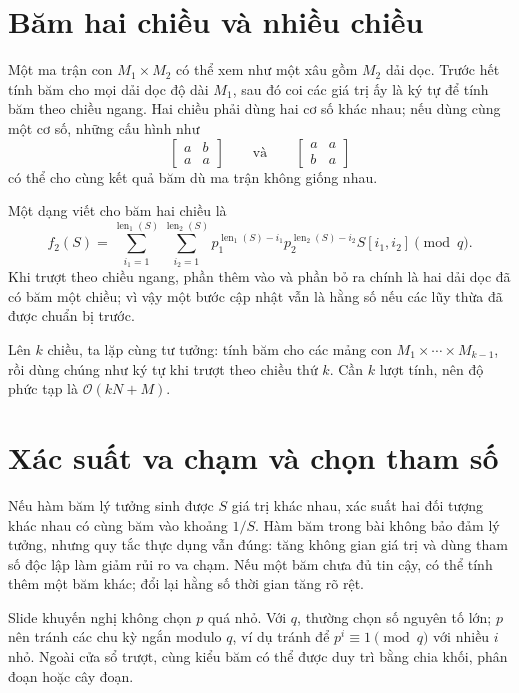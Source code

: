 \documentclass[11pt]{article}
\newcommand{\Oh}{\mathcal{O}}
\begin{document}
\section{Băm hai chiều và nhiều chiều}

Một ma trận con \(M_1\times M_2\) có thể xem như một xâu gồm \(M_2\) dải dọc.
Trước hết tính băm cho mọi dải dọc độ dài \(M_1\), sau đó coi các giá trị ấy
là ký tự để tính băm theo chiều ngang. Hai chiều phải dùng hai cơ số khác
nhau; nếu dùng cùng một cơ số, những cấu hình như
\[
\begin{bmatrix}
a & b\\
a & a
\end{bmatrix}
\qquad\text{và}\qquad
\begin{bmatrix}
a & a\\
b & a
\end{bmatrix}
\]
có thể cho cùng kết quả băm dù ma trận không giống nhau.

Một dạng viết cho băm hai chiều là
\[
  f_2(S)=
  \sum_{i_1=1}^{\operatorname{len}_1(S)}
  \sum_{i_2=1}^{\operatorname{len}_2(S)}
  p_1^{\operatorname{len}_1(S)-i_1}
  p_2^{\operatorname{len}_2(S)-i_2}
  S[i_1,i_2]\pmod q.
\]
Khi trượt theo chiều ngang, phần thêm vào và phần bỏ ra chính là hai dải dọc
đã có băm một chiều; vì vậy một bước cập nhật vẫn là hằng số nếu các lũy thừa
đã được chuẩn bị trước.

Lên \(k\) chiều, ta lặp cùng tư tưởng: tính băm cho các mảng con
\(M_1\times\cdots\times M_{k-1}\), rồi dùng chúng như ký tự khi trượt theo
chiều thứ \(k\). Cần \(k\) lượt tính, nên độ phức tạp là \(\Oh(kN+M)\).

\section{Xác suất va chạm và chọn tham số}

Nếu hàm băm lý tưởng sinh được \(S\) giá trị khác nhau, xác suất hai đối tượng
khác nhau có cùng băm vào khoảng \(1/S\). Hàm băm trong bài không bảo đảm lý
tưởng, nhưng quy tắc thực dụng vẫn đúng: tăng không gian giá trị và dùng tham
số độc lập làm giảm rủi ro va chạm. Nếu một băm chưa đủ tin cậy, có thể tính
thêm một băm khác; đổi lại hằng số thời gian tăng rõ rệt.

Slide khuyến nghị không chọn \(p\) quá nhỏ. Với \(q\), thường chọn số nguyên
tố lớn; \(p\) nên tránh các chu kỳ ngắn modulo \(q\), ví dụ tránh để
\(p^i\equiv 1\pmod q\) với nhiều \(i\) nhỏ. Ngoài cửa sổ trượt, cùng kiểu băm
có thể được duy trì bằng chia khối, phân đoạn hoặc cây đoạn.
\end{document}
